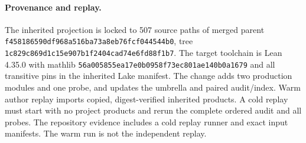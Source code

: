 \documentclass[11pt]{article}
\begin{document}
\paragraph{Provenance and replay.}
The inherited projection is locked to 507 source paths of merged parent
\nolinkurl{f458186590df968a516ba73a8eb76fcf044544b0},
tree \nolinkurl{1c829c869d1c15e907b1f2404cad74e6fd88f1b7}.
The target toolchain is Lean 4.35.0 with mathlib
\nolinkurl{56a005855ea17e0b0958f73ec801ae140b0a1679} and all transitive
pins in the inherited Lake manifest. The change adds two production
modules and one probe, and updates the umbrella and paired audit/index.
Warm author replay imports copied, digest-verified inherited products.
A cold replay must start with no project products and rerun the complete
ordered audit and all probes. The repository evidence includes a cold replay runner
and exact input manifests. The warm run is not the independent replay.
\end{document}
